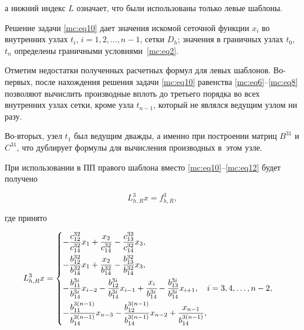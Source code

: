 а нижний индекс $L$ означает, что были использованы только левые шаблоны.



Решение задачи \eqref{mc:eq10} дает значения искомой сеточной функции $x_i$ во внутренних узлах $   t_i$, $   i=1,  2,  \dots,  n-1$, сетки $   D_h$; значения в граничных узлах  $   t_0$, $t_n$ определены граничными условиями~\eqref{mc:eq2}.



Отметим недостатки полученных расчетных формул для левых шаблонов. Во-первых, после нахождения решения задачи \eqref{mc:eq10} равенства \eqref{mc:eq6}--\eqref{mc:eq8} позволяют вычислить производные вплоть до третьего порядка во всех внутренних узлах сетки, кроме узла $   t_{n-1}$, который не являлся ведущим узлом ни разу. 

Во-вторых, узел $   t_1$ был ведущим дважды, а именно при построении матриц $  B^{31}$ и $  C^{31}$, что дублирует формулы для вычисления производных в~этом узле.



При использовании в ПП правого шаблона вместо \eqref{mc:eq10}--\eqref{mc:eq12}  будет получено

\begin{equation}

\label{mc:eq14}

   L_{h,R}^3x=f_{h,R}^3,

\end{equation}

где принято

\begin{equation}

\label{mc:eq15}

   L_{h,R}^3x

=\begin{cases} 

-\dfrac{c_{12}^{32}}{c_{14}^{32}} x_{1}+\dfrac{x_2}{c_{14}^{32}}-\dfrac{c_{13}^{32}}{c_{14}^{32}} x_{3},

\\[3mm]

-\dfrac{b_{12}^{32}}{b_{14}^{32}} x_{1}+\dfrac{x_2}{b_{14}^{32}}-\dfrac{b_{13}^{32}}{b_{14}^{32}} x_{3},

\\[3mm]

-\dfrac{b_{11}^{3i}}{b_{14}^{3i}} x_{i-2}-\dfrac{b_{12}^{3i}}{b_{14}^{3i}} x_{i-1}+\cfrac{x_i}{b_{14}^{3i}}-\dfrac{b_{13}^{3i}}{b_{14}^{3i}} x_{i+1},\quad  i=3,  4,  \dots,  n-2,

\\[3mm]

-\dfrac{b_{11}^{3(n-1)}}{b_{14}^{3(n-1)}} x_{n-3}-\dfrac{b_{12}^{3(n-1)}}{b_{14}^{3(n-1)}} x_{n-2}+\dfrac{x_{n-1}}{b_{14}^{3(n-1)}},

\end{cases}

\end{equation}

